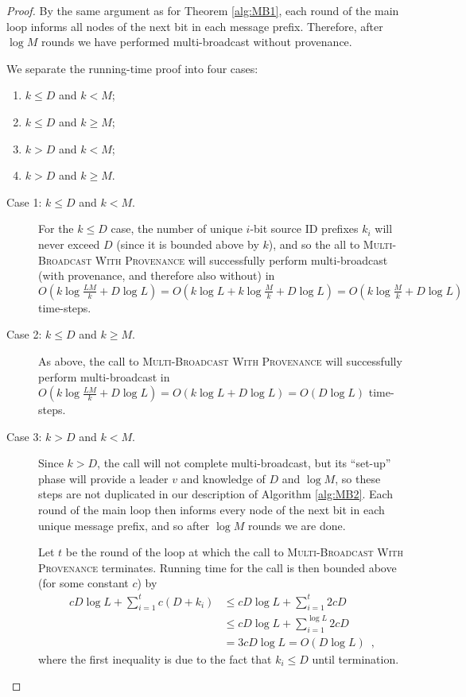 \documentclass{article}
\begin{document}
\begin{proof}
	By the same argument as for Theorem \ref{alg:MB1}, each round of the main loop informs all nodes of the next bit in each message prefix. Therefore, after $\log M$ rounds we have performed multi-broadcast without provenance.
	
	We separate the running-time proof into four cases:
	\begin{enumerate}[\bf (1) ]
		\item $k \le D$ and $k< M$;
		\item $k \le D$ and $k\ge M$;
		\item $k>D$ and $k< M$;
		\item $k>D$ and $k \ge M$.
	\end{enumerate}
	
	\begin{description}
		\item[Case 1: $k \le D$ and $k< M$.]
		
		For the $k \le D$ case, the number of unique $i$-bit source ID prefixes $k_i$ will never exceed $D$ (since it is bounded above by $k$), and so the all to \textsc{Multi-Broadcast With Provenance} will successfully perform multi-broadcast (with provenance, and therefore also without) in $O(k \log \frac{LM}{k} + D \log L) = O(k \log {L} + k \log \frac{M}{k} + D \log L) = O(k \log \frac Mk+D \log L)$ time-steps.
		
		\item[Case 2: $k \le D$ and $k\ge M$.]
		
		As above, the call to \textsc{Multi-Broadcast With Provenance} will successfully perform multi-broadcast in $O(k \log \frac{LM}{k} + D \log L) = O(k \log {L} + D \log L) = O(D \log L)$ time-steps.
		
		\item[Case 3: $k>D$ and $k< M$.]
		
		Since $k>D$, the call will not complete multi-broadcast, but its ``set-up'' phase will provide a leader $v$ and knowledge of $D$ and $\log M$, so these steps are not duplicated in our description of Algorithm \ref{alg:MB2}. Each round of the main loop then informs every node of the next bit in each unique message prefix, and so after $\log M$ rounds we are done.
		
		Let $t$ be the round of the loop at which the call to \textsc{Multi-Broadcast With Provenance} terminates. Running time for the call is then bounded above (for some constant $c$) by
\begin{align*}
		c D \log L + \sum_{i=1}^{t} c (D+ k_i)
		&\le
		c D \log L + \sum_{i=1}^{t} 2cD
		\\
		&\le
		c D \log L + \sum_{i=1}^{\log L} 2cD
		\\
		&=
		3 c D \log L
		=
		O(D \log L)
		\enspace,
		\end{align*}
where the first inequality is due to the fact that $k_i \le D$ until termination.
		

\end{description}
\end{proof}
\end{document}
